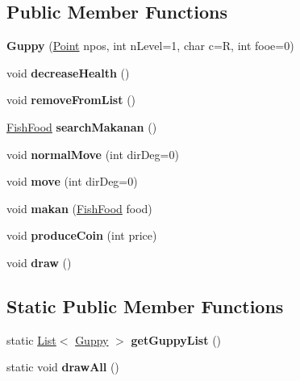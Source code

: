 \subsection*{Public Member Functions}
\begin{DoxyCompactItemize}
\item 
\mbox{\label{class_guppy_ae06e1cd99ed7465d2a0b7754153971cd}} 
{\bfseries Guppy} (\mbox{\hyperlink{class_point}{Point}} npos, int n\+Level=1, char c=\textquotesingle{}R\textquotesingle{}, int fooe=0)
\item 
\mbox{\label{class_guppy_a4b9e9891d373378b04f953eb7e174703}} 
void {\bfseries decrease\+Health} ()
\item 
\mbox{\label{class_guppy_a2fc22c1ccc32961cdfd37522ad05a341}} 
void {\bfseries remove\+From\+List} ()
\item 
\mbox{\label{class_guppy_aabf3fb7f79f5d95d25c03ae098f748c1}} 
\mbox{\hyperlink{class_fish_food}{Fish\+Food}} {\bfseries search\+Makanan} ()
\item 
\mbox{\label{class_guppy_a55934fc9069ad5794994785bdba20ba5}} 
void {\bfseries normal\+Move} (int dir\+Deg=0)
\item 
\mbox{\label{class_guppy_ae5747e277690dda160686e41822d0967}} 
void {\bfseries move} (int dir\+Deg=0)
\item 
\mbox{\label{class_guppy_ad9be268a40b05d84b9394610254179ca}} 
void {\bfseries makan} (\mbox{\hyperlink{class_fish_food}{Fish\+Food}} food)
\item 
\mbox{\label{class_guppy_a6d6b058e700fe8f7592afe59cd91eada}} 
void {\bfseries produce\+Coin} (int price)
\item 
\mbox{\label{class_guppy_a3438f0c503f0260034115ace01264cdc}} 
void {\bfseries draw} ()
\end{DoxyCompactItemize}
\subsection*{Static Public Member Functions}
\begin{DoxyCompactItemize}
\item 
\mbox{\label{class_guppy_a21918ee02e231b7fa97546765d57c1b1}} 
static \mbox{\hyperlink{class_list}{List}}$<$ \mbox{\hyperlink{class_guppy}{Guppy}} $>$ {\bfseries get\+Guppy\+List} ()
\item 
\mbox{\label{class_guppy_a221be82f9bf137d155ca8daccdf3fa41}} 
static void {\bfseries draw\+All} ()
\end{DoxyCompactItemize}
